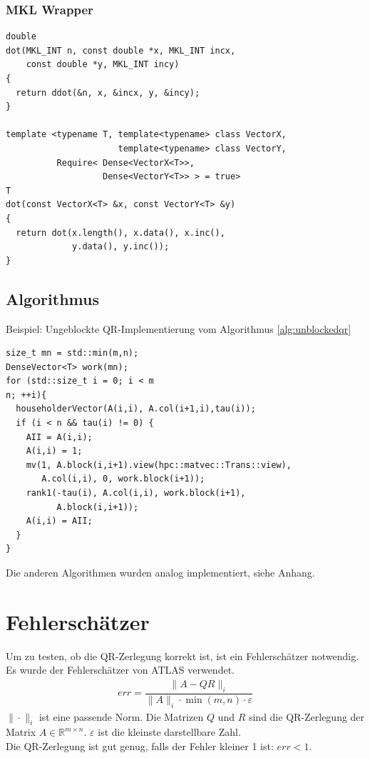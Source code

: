\subsubsection{MKL Wrapper}
\lstset{numbers=left,firstnumber=14}
\begin{lstlisting}
double
dot(MKL_INT n, const double *x, MKL_INT incx,
    const double *y, MKL_INT incy)
{
  return ddot(&n, x, &incx, y, &incy);
}

template <typename T, template<typename> class VectorX,
                      template<typename> class VectorY,
          Require< Dense<VectorX<T>>,
                   Dense<VectorY<T>> > = true>
T
dot(const VectorX<T> &x, const VectorY<T> &y)
{
  return dot(x.length(), x.data(), x.inc(), 
             y.data(), y.inc());
}
\end{lstlisting}



\subsection{Algorithmus}

Beispiel: Ungeblockte QR-Implementierung vom Algorithmus \ref{alg:unblockedqr}
\lstset{numbers=left,firstnumber=1}
\begin{lstlisting}
size_t mn = std::min(m,n);
DenseVector<T> work(mn);
for (std::size_t i = 0; i < m
n; ++i){
  householderVector(A(i,i), A.col(i+1,i),tau(i));
  if (i < n && tau(i) != 0) {
    AII = A(i,i);
    A(i,i) = 1;
    mv(1, A.block(i,i+1).view(hpc::matvec::Trans::view),
       A.col(i,i), 0, work.block(i+1));
    rank1(-tau(i), A.col(i,i), work.block(i+1), 
          A.block(i,i+1));
    A(i,i) = AII;
  }
}
\end{lstlisting}

Die anderen Algorithmen wurden analog implementiert, siehe Anhang.

\section{Fehlerschätzer}

Um zu testen, ob die QR-Zerlegung korrekt ist, ist ein Fehlerschätzer notwendig.
Es wurde der Fehlerschätzer von ATLAS \cite{atlas} verwendet.
\begin{align}
err = \dfrac{\|A - QR\|_i}{\|A\|_i \cdot \min(m,n) \cdot \varepsilon}
\end{align}
$\|\cdot\|_i$ ist eine passende Norm.
Die Matrizen $Q$ und $R$ sind die QR-Zerlegung der Matrix $A \in \mathbb{R}^{m \times n}$.
$\varepsilon$ ist die kleinste darstellbare Zahl.\\
Die QR-Zerlegung ist gut genug, falls der Fehler kleiner 1 ist: $ err < 1 $.

